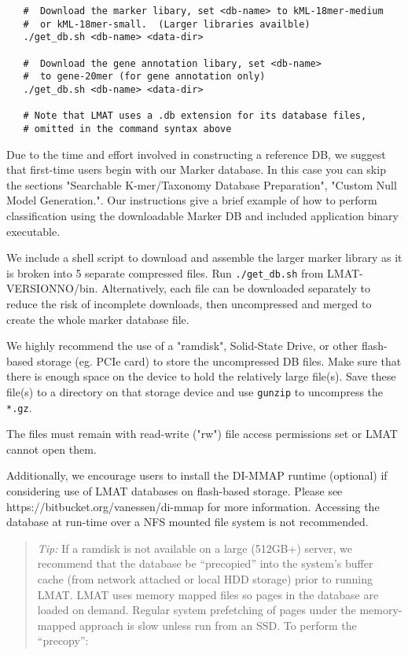 \documentclass[11pt]{article}
\newcommand{\lmatver}{VERSIONNO}
\begin{document}
\begin{enumerate}[A.]
{\begin{verbatim}
   #  Download the marker libary, set <db-name> to kML-18mer-medium
   #  or kML-18mer-small.  (Larger libraries availble)
   ./get_db.sh <db-name> <data-dir>

   #  Download the gene annotation libary, set <db-name> 
   #  to gene-20mer (for gene annotation only)
   ./get_db.sh <db-name> <data-dir>

   # Note that LMAT uses a .db extension for its database files,
   # omitted in the command syntax above

\end{verbatim}     
         
     Due to the time and effort involved in constructing a reference
     DB, we suggest that first-time users begin with our Marker
     database.  In this case you can skip the sections "Searchable
     K-mer/Taxonomy Database Preparation", "Custom Null Model
     Generation.".  Our  instructions give a
     brief example of how to perform classification using the
     downloadable Marker DB and included application binary
     executable.

     We include a shell script to download and assemble the larger
     marker library as it is broken into 5 separate compressed files.
     Run \texttt{./get\_db.sh} from LMAT-\lmatver/bin.
     Alternatively, each file can be downloaded separately to reduce
     the risk of incomplete downloads, then uncompressed and merged to
     create the whole marker database file.
        
     We highly recommend the use of a "ramdisk", Solid-State Drive, or
     other flash-based storage (eg. PCIe card) to store the
     uncompressed DB files.  Make sure that there is enough space on
     the device to hold the relatively large file(s).  Save these
     file(s) to a directory on that storage device and use
     \texttt{gunzip} to uncompress the \texttt{*.gz}.

     The files must remain with read-write ("rw") file access
     permissions set or LMAT cannot open them.

     Additionally, we encourage users to install
     the DI-MMAP runtime (optional) if considering use of LMAT
     databases on flash-based storage.  Please see
     https://bitbucket.org/vanessen/di-mmap for more information.
     Accessing the database at run-time over a NFS mounted file system
     is not recommended.  

\begin{quote}
  {\it Tip:} If a ramdisk is not available on a large (512GB+) server,
  we recommend that the database be ``precopied'' into the system's
  buffer cache (from network attached or local HDD storage) prior to
  running LMAT.  LMAT uses memory mapped files so pages in the
  database are loaded on demand.  Regular system prefetching of pages
  under the memory-mapped approach is slow unless run from an SSD.  To
  perform the ``precopy'':


\end{quote}}
\end{enumerate}
\end{document}
